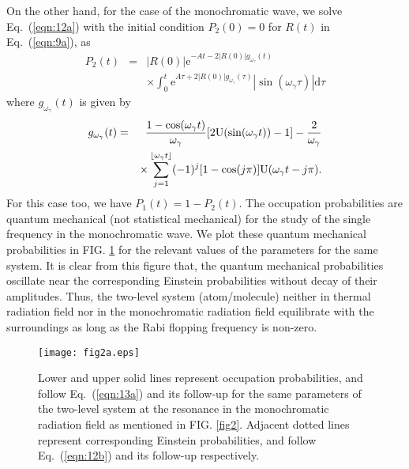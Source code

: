 \documentclass[aps,pra,twocolumn,showpacs,preprintnumbers,amsmath,amssymb,footinbib]{revtex4}
\DeclarePairedDelimiter{\floor}{\lfloor}{\rfloor}
\begin{document}
On the other hand, for the case of the monochromatic wave, we solve Eq.~(\ref{eqn:12a}) with the initial condition $P_2(0)=0$ for $R(t)$ in Eq.~(\ref{eqn:9a}), as
\begin{eqnarray}\label{eqn:13a}
P_2(t)&=&|R(0)|\text{e}^{-At-2|R(0)|g_{\omega_\gamma}(t)}\nonumber\\&&\times\int_0^t\text{e}^{A\tau+2|R(0)|g_{\omega_\gamma}(\tau)}|\sin(\omega_\gamma\tau)|\text{d}\tau
\end{eqnarray}
where $g_{\omega_\gamma}(t)$ is given by
\begin{eqnarray}\label{eqn:13y}
g_{\omega_\gamma}(t)&=&\frac{1 - \cos(\omega_\gamma t)}{\omega_\gamma} [2\text{U}(\sin(\omega_\gamma t))-1]-\frac{2}{\omega_\gamma}\nonumber\\&&\times\sum_{j=1}^{\floor*{\omega_\gamma t}}(-1)^j[1-\cos(j\pi)]\text{U}(\omega_\gamma t-j\pi).
\end{eqnarray}
For this case too, we have $P_1(t)=1-P_2(t)$. The occupation probabilities are quantum mechanical (not statistical mechanical) for the study of the single frequency in the monochromatic wave. We plot these quantum mechanical probabilities in FIG. \ref{fig2a} for the relevant values of the parameters for the same system. It is clear from this figure that, the quantum mechanical probabilities oscillate near the corresponding Einstein probabilities without decay of their amplitudes. Thus, the two-level system (atom/molecule) neither in thermal radiation field nor in the monochromatic radiation field equilibrate with the surroundings as long as the Rabi flopping frequency is non-zero. 

\begin{figure}
\texttt{[image: fig2a.eps]}
\caption{
Lower and upper solid lines represent occupation probabilities, and follow Eq.~(\ref{eqn:13a}) and its follow-up for the same parameters of the two-level system at the resonance in the monochromatic radiation field as mentioned in FIG. \ref{fig2}. Adjacent dotted lines represent corresponding Einstein probabilities, and follow Eq.~(\ref{eqn:12b}) and its follow-up respectively. 
\label{fig2a}}
\end{figure}
\end{document}
